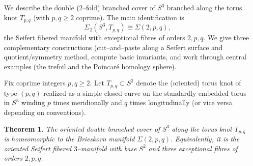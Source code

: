 \documentclass[table]{amsart}
\newtheorem{theorem}{Theorem}[section]
\numberwithin{equation}{section}
\begin{document}
We describe the double (2--fold) branched cover of \(S^3\) branched along the torus knot \(T_{p,q}\) (with \(p,q\ge2\) coprime).  The main identification is
\[
\Sigma_2(S^3, T_{p,q}) \cong \Sigma(2,p,q),
\]
the Seifert fibered manifold with exceptional fibres of orders \(2,p,q\).  We give three complementary constructions (cut--and--paste along a Seifert surface and quotient/symmetry method, compute basic invariants, and work through central examples (the trefoil and the Poincaré homology sphere).



Fix coprime integers \(p,q\ge2\). Let \(T_{p,q}\subset S^3\) denote the (oriented) torus knot of type \((p,q)\) realized as a simple closed curve on the standardly embedded torus in \(S^3\) winding \(p\) times meridionally and \(q\) times longitudinally (or vice versa depending on conventions).

\begin{theorem}\label{thm:main}
The oriented double branched cover of \(S^3\) along the torus knot \(T_{p,q}\) is homeomorphic to the Brieskorn manifold \(\Sigma(2,p,q)\). Equivalently, it is the oriented Seifert fibered $3$--manifold with base \(S^2\) and three exceptional fibres of orders \(2,p,q\).
\end{theorem}
\end{document}
